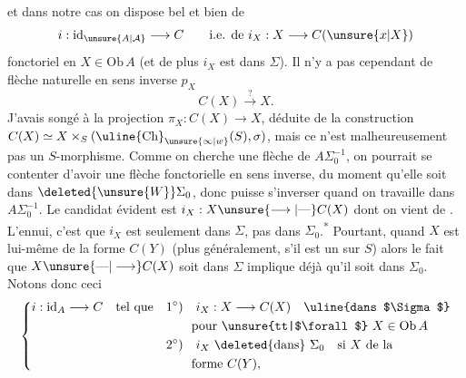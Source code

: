 et dans notre cas on dispose bel et bien de
\[
 i:\mathrm{id}_{\unsure{A|\mathcal A}}\longrightarrow C\qquad\text{i.e. de }i_X:X\longrightarrow C(\unsure{x|X})
\]
fonctoriel en $X\in\mathrm{Ob}\,A$ (et de plus $i_X$ est dans $\Sigma$). Il n'y a pas cependant de flèche naturelle en sens inverse $p_X$
\[
 C(X)\xrightarrow{?}X.
\]
J'avais songé à la projection $\pi_X:C(X)\longrightarrow X$, déduite de la construction $C(X)\simeq X\times_S(\text{\uline{Ch}}_{\unsure{\infty|w}}(S),\sigma)$, mais ce n'est malheureusement pas un $S$-morphisme. Comme on cherche une flèche de $A\Sigma_0^{-1}$, on pourrait se contenter d'avoir une flèche fonctorielle en sens inverse, du moment qu'elle soit dans $\deleted{\unsure{W}}\Sigma_0$, donc puisse s'inverser quand on travaille dans $A\Sigma_0^{-1}$. Le candidat évident est $i_X:X\unsure{\longrightarrow|\text{---}}C(X)$ dont on vient de . L'ennui, c'est que $i_X$ est seulement dans $\Sigma$, pas dans $\Sigma_0$.\textsuperscript{*}
Pourtant, quand $X$ est lui-même de la forme $C(Y)$ (plus généralement, s'il est un  sur $S$) alors  le fait que $X\unsure{\text{---}|\longrightarrow}C(X)$ soit dans $\Sigma$ implique déjà qu'il soit dans $\Sigma_0$. Notons donc ceci
\[
 \left\{\begin{aligned}
 i:\mathrm{id}_A\longrightarrow C\quad\text{tel que}\quad&
 1^\circ)\quad i_X:X\longrightarrow C(X)\quad\text{\uline{dans $\Sigma$}}\\
 &\hspace{2em}\text{pour \unsure{tt|$\forall$} }X\in\mathrm{Ob}\,A\\
 &2^\circ)\quad i_X\ \text{\deleted{dans}}\ \Sigma_0\quad\text{si }X\text{ de la}\\
 &\hspace{2em}\text{forme }C(Y),
 \end{aligned}\right.
\]
